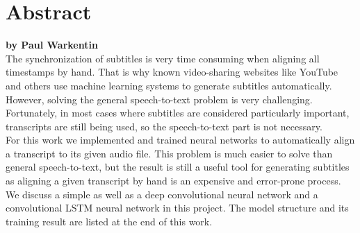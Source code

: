 \chapter*{Abstract}

\textbf{by Paul Warkentin} \\

The synchronization of subtitles is very time consuming when aligning all timestamps by hand. That is why known video-sharing websites like YouTube and others use machine learning systems to generate subtitles automatically. However, solving the general speech-to-text problem is very challenging. Fortunately, in most cases where subtitles are considered particularly important, transcripts are still being used, so the speech-to-text part is not necessary. \\

For this work we implemented and trained neural networks to automatically align a transcript to its given audio file. This problem is much easier to solve than general speech-to-text, but the result is still a useful tool for generating subtitles as aligning a given transcript by hand is an expensive and error-prone process. \\

We discuss a simple as well as a deep convolutional neural network and a convolutional LSTM neural network in this project. The model structure and its training result are listed at the end of this work.
